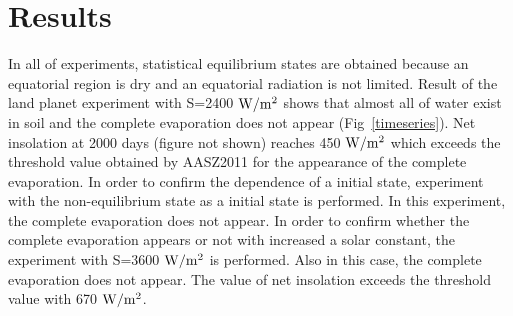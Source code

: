 \documentclass[dvipdfmx,twocolumn,10pt]{jsarticle}
\newcommand{\Figref}[1]{Fig~\ref{#1}}
\begin{document}
\section{Results}
\vspace{-0.5zh}
In all of experiments, statistical equilibrium states are obtained because an equatorial region is dry and an equatorial radiation is not limited. 
Result of the land planet experiment with S=2400 $\rm{W/m^{2}}$ shows that almost all of water exist in soil and the complete evaporation does not appear (\Figref{timeseries}). 
Net insolation at 2000 days (figure not shown) reaches 450 $\rm{W/m^{2}}$ which exceeds the threshold value obtained by AASZ2011 for the appearance of the complete evaporation. 
In order to confirm the dependence of a initial state, experiment with the non-equilibrium state as a initial state is performed. 
In this experiment, the complete evaporation does not appear. 
In order to confirm whether the complete evaporation appears or not with increased a solar constant, the experiment with S=3600 $\rm{W/m^{2}}$ is performed. 
Also in this case, the complete evaporation does not appear. 
The value of net insolation exceeds the threshold value with 670 $\rm{W/m^{2}}$. 
\end{document}
